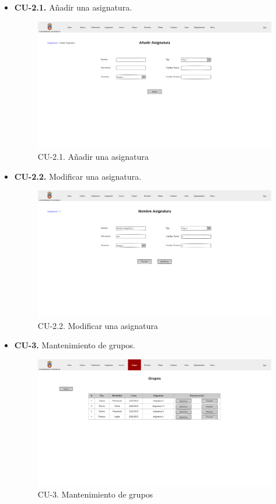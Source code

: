 \begin{itemize}
	\item \textbf{CU-2.1.} Añadir una asignatura.
	\begin{figure}[!h]
		\centering
		\includegraphics[width=\textwidth]{../img/Anexos/Vistas/add_asignatura.png}
		\caption{CU-2.1. Añadir una asignatura}\label{fig:../img/Anexos/Vistas/add_asignatura.png}
	\end{figure}
	
	\item \textbf{CU-2.2.} Modificar una asignatura.
	\begin{figure}[!h]
		\centering
		\includegraphics[width=\textwidth]{../img/Anexos/Vistas/mod_asignatura.png}
		\caption{CU-2.2. Modificar una asignatura}\label{fig:../img/Anexos/Vistas/mod_asignatura.png}
	\end{figure}
	
	\item \textbf{CU-3.} Mantenimiento de grupos.
	\begin{figure}[!h]
		\centering
		\includegraphics[width=\textwidth]{../img/Anexos/Vistas/grupos.png}
		\caption{CU-3. Mantenimiento de grupos}\label{fig:../img/Anexos/Vistas/grupos.png}
	\end{figure}
	

\end{itemize}
